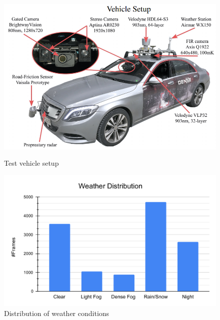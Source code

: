 \documentclass[report.tex]{subfiles}
\begin{document}
        \begin{figure}[h]
            \centering
            \begin{minipage}{0.45\textwidth}
                \centering
                \includegraphics[width=\textwidth]{images/datasets/dense/test_vehicle_setup.png}
                \caption{Test vehicle setup \cite{bijelic2020seeing}}
                \label{fig:dense_test_vehicle_setup}
            \end{minipage}
            \hfill
            \begin{minipage}{0.45\textwidth}
                \centering
                \includegraphics[width=\textwidth]{images/datasets/dense/distribution_of_weather_conditions.pdf}
                \caption{Distribution of weather conditions \cite{bijelic2020seeing}}
                \label{fig:dense_distribution_of_weather_conditions}
            \end{minipage}
        \end{figure}
        
\end{document}
